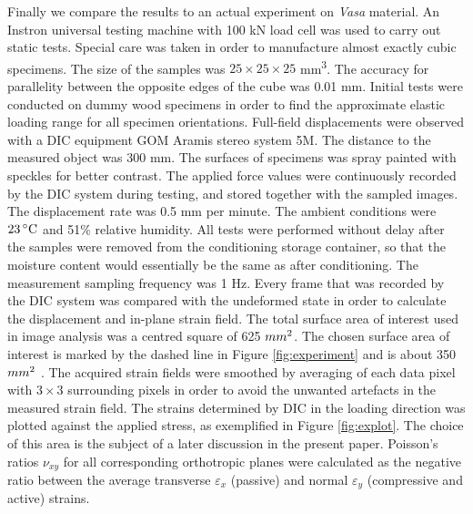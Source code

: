\documentclass[review]{elsarticle}
\begin{document}
Finally we compare the results to an actual experiment on \textit{Vasa}
material.
An Instron universal testing machine with 100 kN load cell was used to carry out static tests. 
Special care was taken in order to manufacture almost exactly cubic specimens. 
The size of the samples was  $25\times25\times25$ mm\textsuperscript{3}.  The
accuracy for parallelity between the opposite edges of the cube was 0.01 mm. 
Initial tests were conducted on dummy wood specimens in order to find the approximate elastic loading range for all specimen orientations.
Full-field displacements were observed with a DIC equipment GOM Aramis stereo system 5M.
The distance to the measured object was 300 mm. The surfaces of specimens was spray
painted with speckles for better contrast. The applied force values were continuously recorded by the DIC system during testing, and stored together with the sampled images. The displacement rate was 0.5 mm per minute. 
The ambient conditions were $23\,^{\circ}{\rm C}$ and 51\% relative humidity.
All tests were performed without delay after the samples were removed from the conditioning storage container, so that the moisture content would essentially be the same as after conditioning. The measurement sampling frequency was 1 Hz. 
Every frame that was recorded by the DIC system was compared with the undeformed state in order to calculate the displacement and in-plane strain field. 
The total surface area of interest used in image analysis was a centred square
of 625 $mm\textsuperscript{2}$.
The chosen surface area of interest is marked by the dashed line in Figure
\ref{fig:experiment} and is about 350 $mm\textsuperscript{2}$ . The acquired
strain fields were smoothed by averaging of each data pixel with $3\times3$ surrounding pixels in order to avoid the
unwanted artefacts in the measured strain field.
The strains determined by DIC in the loading direction was plotted against the
applied stress, as exemplified in Figure \ref{fig:explot}. The choice of this
area is the subject of a later discussion in the present paper.
Poisson's ratios $\nu_{xy}$ for all corresponding orthotropic planes were
calculated as the negative ratio between the average transverse
$\varepsilon_{x}$ (passive) and normal $\varepsilon_{y}$ (compressive and
active) strains.
\end{document}

